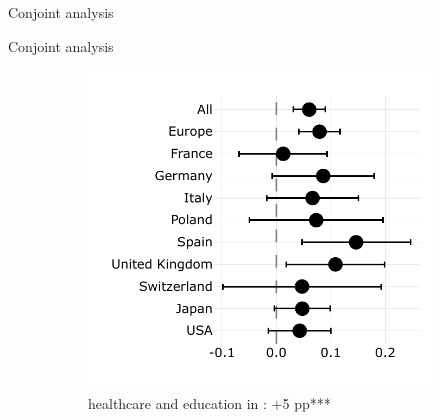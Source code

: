 \documentclass[aspectratio=169,xcolor=dvipsnames, 11pt,mathserif]{beamer}
\begin{document}
\begin{frame}{Conjoint analysis}
\end{frame}

\begin{frame}{Conjoint analysis}
    \begin{figure}
\caption{ the  political  of containing the following policy%
} \vspace{-.3cm}
\begin{subfigure}{.48\textwidth}
  \caption[]{ healthcare and education in : +5 pp***} \vspace{-.3cm}
  \includegraphics[width=\textwidth]{../figures/country_comparison/program_preferred_by_millionaire_tax_in_program.pdf}
\end{subfigure} \quad
\begin{subfigure}{.48\textwidth}
  \caption[]{}\vspace{-.3cm}

\end{subfigure}
\end{figure}
\end{frame}
\end{document}
